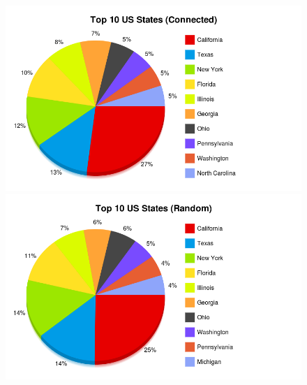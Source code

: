 \begin{figure}[t]
 \centering
 \includegraphics[bb=0 0 800 500,scale=.2]{./images/loca-conn.png}
\caption{}
\label{fig:loca-conn}

 \includegraphics[bb=0 0 800 500,scale=.2]{./images/loca-rand.png}
\caption{}
\label{fig:loca-rand}


\end{figure}
